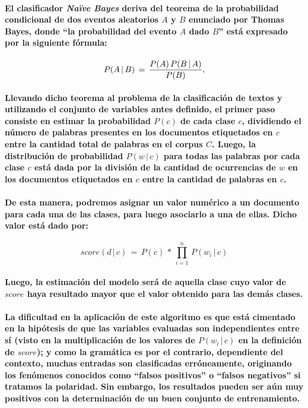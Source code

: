\paragraph{El clasificador \textit{Na\"ive Bayes} deriva del teorema de la probabilidad condicional de dos eventos aleatorios $A$ y $B$ enunciado por Thomas Bayes, donde ``la probabilidad del evento $A$ dado $B$'' est\'a expresado por la siguiente f\'ormula:}
$$P(A \, | \, B) \, = \, {P(A) \, P(B \, | \, A) \over P(B)},$$
\paragraph{Llevando dicho teorema al problema de la clasificaci\'on de textos y utilizando el conjunto de variables antes definido, el primer paso consiste en estimar la probabilidad $P(c)$ de cada clase $c$, dividiendo el n\'umero de palabras presentes en los documentos etiquetados en $c$ entre la cantidad total de palabras en el corpus $C$. Luego, la distribuci\'on de probabilidad $P(w \, | \, c)$ para todas las palabras por cada clase $c$ est\'a dada por la divisi\'on de la cantidad de ocurrencias de $w$ en los documentos etiquetados en $c$ entre la cantidad de palabras en $c$.}
\paragraph{De esta manera, podremos asignar un valor num\'erico a un documento para cada una de las clases, para luego asociarlo a una de ellas. Dicho valor est\'a dado por:}
$$ score(d \, | \, c) \, = \, P(c) \, * \, \prod_{i=1}^n \, P(w_{i} \, | \, c) $$

\paragraph{Luego, la estimaci\'on del modelo ser\'a de aquella clase cuyo valor de $score$ haya resultado mayor que el valor obtenido para las dem\'as clases.}
\paragraph{La dificultad en la aplicaci\'on de este algoritmo es que est\'a cimentado en la hip\'otesis de que las variables evaluadas son independientes entre s\'i (visto en la multiplicaci\'on de los valores de $P(w_{i} \, | \, c)$ en la definici\'on de $score$); y como la gram\'atica es por el contrario, dependiente del contexto, muchas entradas son clasificadas err\'oneamente, originando los fen\'omenos conocidos como ``falsos positivos'' o ``falsos negativos'' si tratamos la polaridad. Sin embargo, los resultados pueden ser a\'un muy positivos con la determinaci\'on de un buen conjunto de entrenamiento.}

